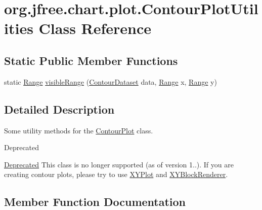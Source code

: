 \hypertarget{classorg_1_1jfree_1_1chart_1_1plot_1_1_contour_plot_utilities}{}\section{org.\+jfree.\+chart.\+plot.\+Contour\+Plot\+Utilities Class Reference}
\label{classorg_1_1jfree_1_1chart_1_1plot_1_1_contour_plot_utilities}
\subsection*{Static Public Member Functions}
\begin{DoxyCompactItemize}
\item 
static \mbox{\hyperlink{classorg_1_1jfree_1_1data_1_1_range}{Range}} \mbox{\hyperlink{classorg_1_1jfree_1_1chart_1_1plot_1_1_contour_plot_utilities_a73298ab4ff8d9772b1c26a69de362faa}{visible\+Range}} (\mbox{\hyperlink{interfaceorg_1_1jfree_1_1data_1_1contour_1_1_contour_dataset}{Contour\+Dataset}} data, \mbox{\hyperlink{classorg_1_1jfree_1_1data_1_1_range}{Range}} x, \mbox{\hyperlink{classorg_1_1jfree_1_1data_1_1_range}{Range}} y)
\end{DoxyCompactItemize}


\subsection{Detailed Description}
Some utility methods for the \mbox{\hyperlink{classorg_1_1jfree_1_1chart_1_1plot_1_1_contour_plot}{Contour\+Plot}} class.

\begin{DoxyRefDesc}{Deprecated}
\item[\mbox{\hyperlink{deprecated__deprecated000055}{Deprecated}}]This class is no longer supported (as of version 1..). If you are creating contour plots, please try to use \mbox{\hyperlink{classorg_1_1jfree_1_1chart_1_1plot_1_1_x_y_plot}{X\+Y\+Plot}} and \mbox{\hyperlink{}{X\+Y\+Block\+Renderer}}. \end{DoxyRefDesc}


\subsection{Member Function Documentation}
\mbox{\label{classorg_1_1jfree_1_1chart_1_1plot_1_1_contour_plot_utilities_a73298ab4ff8d9772b1c26a69de362faa}} 

